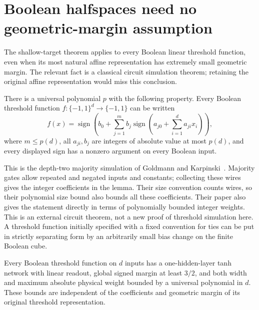 \section{Boolean halfspaces need no geometric-margin assumption}
\label{sec:halfspaces-no-geometric-margin}

The shallow-target theorem applies to every Boolean linear threshold
function, even when its most natural affine representation has extremely
small geometric margin. The relevant fact is a classical circuit
simulation theorem; retaining the original affine representation would
miss this conclusion.

\begin{lemma}
\label{lem:goldmann-karpinski-simulation}
There is a universal polynomial $p$ with the following property.
Every Boolean threshold function $f:\{-1,1\}^d\to\{-1,1\}$ can be
written
\[
 f(x)=\operatorname{sign}\!\left(b_0+
       \sum_{j=1}^m b_j\operatorname{sign}
       \left(a_{j0}+\sum_{i=1}^d a_{ji}x_i\right)\right),
\]
where $m\le p(d)$, all $a_{ji},b_j$ are integers of absolute value
at most $p(d)$, and every displayed sign has a nonzero argument on
every Boolean input.
\end{lemma}

This is the depth-two majority simulation of
Goldmann and Karpinski~\cite{goldmann1998}. Majority gates allow repeated and negated
inputs and constants; collecting these wires gives the integer
coefficients in the lemma. Their size convention counts wires, so their
polynomial size bound also bounds all these coefficients. Their paper
also gives the statement directly in terms of polynomially bounded
integer weights. This is an external circuit theorem, not a new proof
of threshold simulation here. A threshold function initially specified
with a fixed convention for ties can be put in strictly separating
form by an arbitrarily small bias change on the finite Boolean cube.

\begin{lemma}
\label{lem:halfspace-shallow-tanh}
Every Boolean threshold function on $d$ inputs has a one-hidden-layer
tanh network with linear readout, global signed margin at least $3/2$,
and both width and maximum absolute physical weight bounded by a
universal polynomial in $d$. These bounds are independent of the
coefficients and geometric margin of its original threshold
representation.
\end{lemma}

